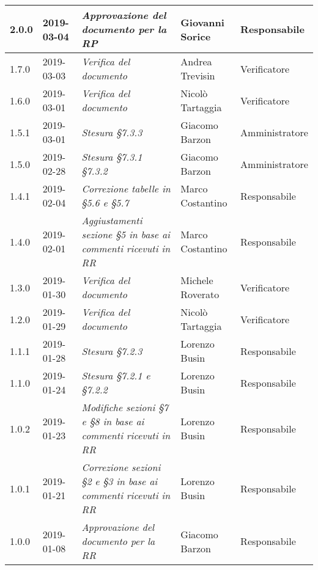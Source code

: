 \begin{longtable}{C{2cm}|C{2.5cm}|C{4.5cm}|C{2.5cm}|C{3cm}}
		2.0.0 & 2019-03-04 & \emph{Approvazione del documento per la RP} & Giovanni Sorice & Responsabile \\
		\hline

		1.7.0 & 2019-03-03 & \emph{Verifica del documento} & Andrea Trevisin & Verificatore \\
		\hline

		1.6.0 & 2019-03-01 & \emph{Verifica del documento} & Nicolò Tartaggia & Verificatore \\
		\hline

		1.5.1 & 2019-03-01 & \emph{Stesura §7.3.3} & Giacomo Barzon & Amministratore \\
		\hline

		1.5.0 & 2019-02-28 & \emph{Stesura §7.3.1 §7.3.2} & Giacomo Barzon & Amministratore \\
		\hline

		1.4.1 & 2019-02-04 & \emph{Correzione tabelle in §5.6 e §5.7} & Marco Costantino & Responsabile \\
		\hline

		1.4.0 & 2019-02-01 & \emph{Aggiustamenti sezione §5 in base ai commenti ricevuti in RR} & Marco Costantino & Responsabile \\
		\hline

		1.3.0 & 2019-01-30 & \emph{Verifica del documento} & Michele Roverato & Verificatore \\
		\hline

		1.2.0 & 2019-01-29 & \emph{Verifica del documento} & Nicolò Tartaggia & Verificatore \\
		\hline

		1.1.1 & 2019-01-28 & \emph{Stesura §7.2.3} & Lorenzo Busin & Responsabile \\
		\hline

		1.1.0 & 2019-01-24 & \emph{Stesura §7.2.1 e §7.2.2} & Lorenzo Busin & Responsabile \\
		\hline

		1.0.2 & 2019-01-23 & \emph{Modifiche sezioni §7 e §8 in base ai commenti ricevuti in RR} & Lorenzo Busin & Responsabile \\
		\hline

		1.0.1 & 2019-01-21 & \emph{Correzione sezioni §2 e §3 in base ai commenti ricevuti in RR} & Lorenzo Busin & Responsabile \\
		\hline

		1.0.0 & 2019-01-08 & \emph{Approvazione del documento per la RR} & Giacomo Barzon & Responsabile \\
		\hline


\end{longtable}
